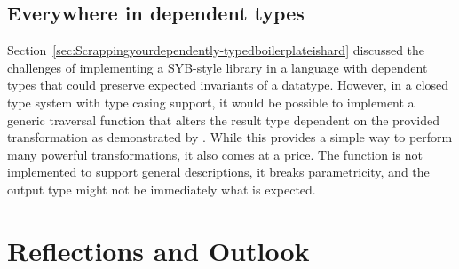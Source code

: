 \documentclass{ituthesis}
\theoremstyle{break}
\begin{document}
\subsection{Everywhere in dependent types}
\label{sub:Everywhere in dependent types}
Section~\ref{sec:Scrappingyourdependently-typedboilerplateishard} discussed the challenges of implementing a SYB-style library in a language with dependent types that could preserve expected invariants of a datatype.
However, in a closed type system with type casing support, it would be possible to implement a generic traversal function that alters the result type dependent on the provided transformation as demonstrated by \textcite{diehl2013every}.
While this provides a simple way to perform many powerful transformations, it also comes at a price.
The function is not implemented to support general descriptions, it breaks parametricity, and the output type might not be immediately what is expected.






\section{Reflections and Outlook}
\label{sec:ReflectionsandOutlook}
\end{document}
